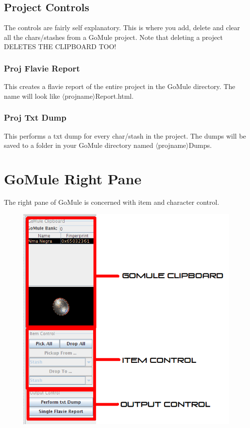 \documentclass[a4paper,10pt]{article}
\begin{document}
\subsection{Project Controls}

The controls are fairly self explanatory. This is where you add, delete and clear all the chars/stashes from a GoMule project. Note that deleting a project DELETES THE CLIPBOARD TOO!

\subsubsection{Proj Flavie Report}

This creates a flavie report of the entire project in the GoMule directory. The name will look like $\langle$projname$\rangle$Report.html.

\subsubsection{Proj Txt Dump}

This performs a txt dump for every char/stash in the project. The dumps will be saved to a folder in your GoMule directory named $\langle$projname$\rangle$Dumps.
\newpage
\section{GoMule Right Pane}

The right pane of GoMule is concerned with item and character control.

\begin{figure}[htp]
\centering
 \includegraphics[width=140mm]{rightpane.png}
\end{figure}
\end{document}
